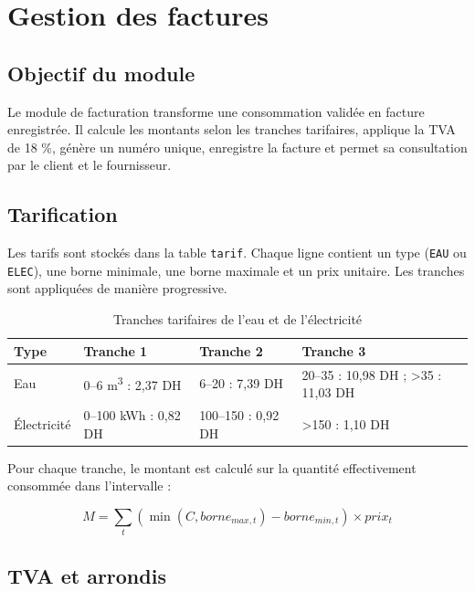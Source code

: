 \section{Gestion des factures}

\subsection{Objectif du module}

Le module de facturation transforme une consommation validée en facture enregistrée. Il calcule les montants selon les tranches tarifaires, applique la TVA de 18 \%, génère un numéro unique, enregistre la facture et permet sa consultation par le client et le fournisseur.

\subsection{Tarification}

Les tarifs sont stockés dans la table \texttt{tarif}. Chaque ligne contient un type (\texttt{EAU} ou \texttt{ELEC}), une borne minimale, une borne maximale et un prix unitaire. Les tranches sont appliquées de manière progressive.

\begin{table}[H]
\centering
\caption{Tranches tarifaires de l'eau et de l'électricité}
\label{tab:tranches}
\small
\begin{tabular}{p{}p{}p{}p{}}
\toprule
\textbf{Type} & \textbf{Tranche 1} & \textbf{Tranche 2} & \textbf{Tranche 3} \\
\midrule
Eau & 0--6 m\textsuperscript{3} : 2,37 DH & 6--20 : 7,39 DH & 20--35 : 10,98 DH ; >35 : 11,03 DH \\
Électricité & 0--100 kWh : 0,82 DH & 100--150 : 0,92 DH & >150 : 1,10 DH \\
\bottomrule
\end{tabular}
\end{table}

Pour chaque tranche, le montant est calculé sur la quantité effectivement consommée dans l'intervalle :

\[
M = \sum_{t} \left( \min(C, borne_{max,t}) - borne_{min,t} \right) \times prix_t
\]

\subsection{TVA et arrondis}

